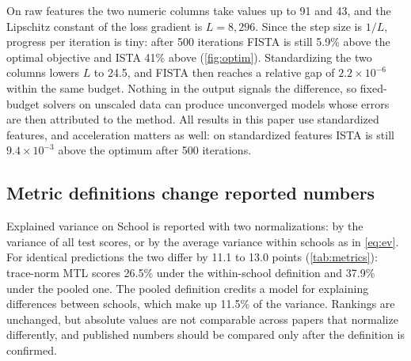 On raw features the two numeric columns take values up to 91 and 43, and the Lipschitz constant of the loss gradient is $L = 8{,}296$. Since the step size is $1/L$, progress per iteration is tiny: after 500 iterations FISTA is still 5.9\% above the optimal objective and ISTA 41\% above (\cref{fig:optim}). Standardizing the two columns lowers $L$ to 24.5, and FISTA then reaches a relative gap of $2.2 \times 10^{-6}$ within the same budget. Nothing in the output signals the difference, so fixed-budget solvers on unscaled data can produce unconverged models whose errors are then attributed to the method. All results in this paper use standardized features, and acceleration matters as well: on standardized features ISTA is still $9.4 \times 10^{-3}$ above the optimum after 500 iterations.

\subsection{Metric definitions change reported numbers}
\label{sec:res-metrics}

Explained variance on School is reported with two normalizations: by the variance of all test scores, or by the average variance within schools as in \eqref{eq:ev}. For identical predictions the two differ by 11.1 to 13.0 points (\cref{tab:metrics}): trace-norm MTL scores 26.5\% under the within-school definition and 37.9\% under the pooled one. The pooled definition credits a model for explaining differences between schools, which make up 11.5\% of the variance. Rankings are unchanged, but absolute values are not comparable across papers that normalize differently, and published numbers should be compared only after the definition is confirmed.
